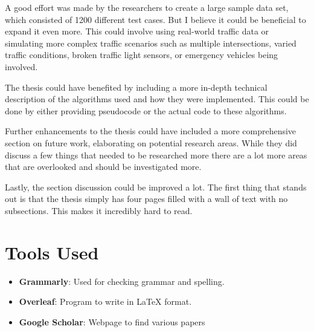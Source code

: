 \documentclass[10pt, titlepage]{article}
\begin{document}
A good effort was made by the researchers to create a large sample data set, which consisted of 1200 different test cases. But I believe it could be beneficial to expand it even more. This could involve using real-world traffic data or simulating more complex traffic scenarios such as multiple intersections, varied traffic conditions, broken traffic light sensors, or emergency vehicles being involved.

The thesis could have benefited by including a more in-depth technical description of the algorithms used and how they were implemented. This could be done by either providing pseudocode or the actual code to these algorithms.

Further enhancements to the thesis could have included a more comprehensive section on future work, elaborating on potential research areas. While they did discuss a few things that needed to be researched more there are a lot more areas that are overlooked and should be investigated more.

Lastly, the section discussion could be improved a lot. The first thing that stands out is that the thesis simply has four pages filled with a wall of text with no subsections. This makes it incredibly hard to read.

\newpage
\section*{Tools Used}
\begin{itemize}
    \item \textbf{Grammarly}: Used for checking grammar and spelling.
    \item  \textbf{Overleaf}: Program to write in LaTeX format.
    \item  \textbf{Google Scholar}: Webpage to find various papers
\end{itemize}

\newpage
\printbibliography
\end{document}

